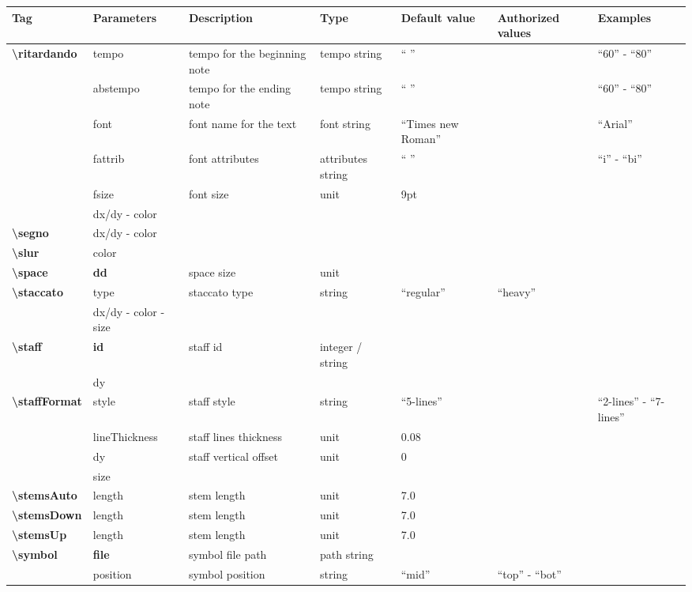 \documentclass[a4paper, landscape, 10pt]{article}
\begin{document}
\begin{tabularx}{\linewidth}{p{3cm}p{3cm}p{5cm}p{3cm}p{2.5cm}p{3.5cm}p{4cm}}
    \hline
    \textbf{Tag}&\textbf{Parameters}&\textbf{Description}&\textbf{Type}&\textbf{Default value}&\textbf{Authorized values}&\textbf{Examples}\\
    \hline
    \textbf{\textbackslash{}ritardando}&tempo&tempo for the beginning note&tempo string&`` ''&&``60'' - ``80''\\
    &abstempo&tempo for the ending note&tempo string&`` ''&&``60'' - ``80''\\
    &font&font name for the text&font string&``Times new Roman''&&``Arial''\\
    &fattrib&font attributes&attributes string&`` ''&&``i'' - ``bi''\\
    &fsize&font size&unit&9pt&&\\
    &dx/dy - color&&&&&\\
    \hline
	\textbf{\textbackslash{}segno}&dx/dy - color&&&&&\\
    \hline
	\textbf{\textbackslash{}slur}&color&&&&&\\
    \hline
    \textbf{\textbackslash{}space}&\textbf{dd}&space size&unit&&&\\
    \hline
    \textbf{\textbackslash{}staccato}&type&staccato type&string&``regular''&``heavy''&\\
    &dx/dy - color - size&&&&&\\
    \hline
    \textbf{\textbackslash{}staff}&\textbf{id}&staff id&integer / string&&&\\
    &dy&&&&&\\
    \hline
    \textbf{\textbackslash{}staffFormat}&style&staff style&string&``5-lines''&&``2-lines'' - ``7-lines''\\
    &lineThickness&staff lines thickness&unit&0.08&&\\
    &dy&staff vertical offset&unit&0&&\\
    &size&&&&&\\
    \hline
    \textbf{\textbackslash{}stemsAuto}&length&stem length&unit&7.0&&\\
    \hline
    \textbf{\textbackslash{}stemsDown}&length&stem length&unit&7.0&&\\
    \hline
    \textbf{\textbackslash{}stemsUp}&length&stem length&unit&7.0&&\\
    \hline
    \textbf{\textbackslash{}symbol}&\textbf{file}&symbol file path&path string&&&\\
    &position&symbol position&string&``mid''&``top'' - ``bot''&\\

\end{tabularx}
\end{document}
